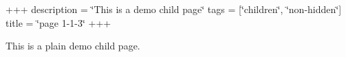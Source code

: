 +++ description = \char`\"{}\+This is a demo child page\char`\"{} tags = \mbox{[}\char`\"{}children\char`\"{}, \char`\"{}non-\/hidden\char`\"{}\mbox{]} title = \char`\"{}page 1-\/1-\/3\char`\"{} +++

This is a plain demo child page. 